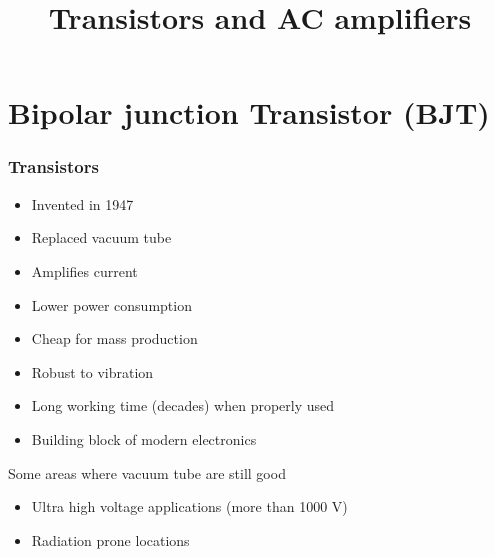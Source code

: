 \documentclass[beamer]{standalone}
\begin{document}
\title[Electronics 1]{Transistors and AC amplifiers}

\begin{frame} 
  \titlepage
\end{frame}

\section{Bipolar junction Transistor (BJT)}
\begin{frame}
\frametitle{Transistors}
\begin{itemize}
 \item Invented in 1947
 \item Replaced vacuum tube 
 \item \alert{Amplifies current}
 \item Lower power consumption
 \item Cheap for mass production
 \item Robust to vibration
 \item Long working time (decades) when properly used
 \item Building block of modern electronics
\end{itemize}
Some areas where vacuum tube are still good
\begin{itemize}
 \item Ultra high voltage applications (more than 1000 V)
 \item Radiation prone locations
\end{itemize}
\end{frame}
 
\end{document}
